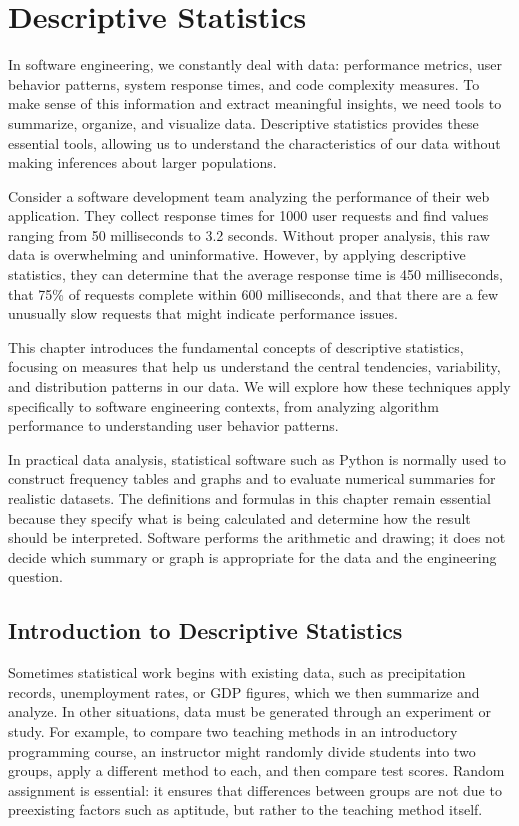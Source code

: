 \chapter{Descriptive Statistics}
\label{ch:data-descriptive-statistics}

In software engineering, we constantly deal with data: performance metrics, user behavior patterns, system response times, and code complexity measures. To make sense of this information and extract meaningful insights, we need tools to summarize, organize, and visualize data. Descriptive statistics provides these essential tools, allowing us to understand the characteristics of our data without making inferences about larger populations.

Consider a software development team analyzing the performance of their web application. They collect response times for 1000 user requests and find values ranging from 50 milliseconds to 3.2 seconds. Without proper analysis, this raw data is overwhelming and uninformative. However, by applying descriptive statistics, they can determine that the average response time is 450 milliseconds, that 75\% of requests complete within 600 milliseconds, and that there are a few unusually slow requests that might indicate performance issues.

This chapter introduces the fundamental concepts of descriptive statistics, focusing on measures that help us understand the central tendencies, variability, and distribution patterns in our data. We will explore how these techniques apply specifically to software engineering contexts, from analyzing algorithm performance to understanding user behavior patterns.

In practical data analysis, statistical software such as Python is normally used to construct frequency tables and graphs and to evaluate numerical summaries for realistic datasets. The definitions and formulas in this chapter remain essential because they specify what is being calculated and determine how the result should be interpreted. Software performs the arithmetic and drawing; it does not decide which summary or graph is appropriate for the data and the engineering question.

\section{Introduction to Descriptive Statistics} \label{sec:ch1-introduction}

Sometimes statistical work begins with existing data, such as precipitation records, unemployment rates, or GDP figures, which we then summarize and analyze. In other situations, data must be generated through an experiment or study. For example, to compare two teaching methods in an introductory programming course, an instructor might randomly divide students into two groups, apply a different method to each, and then compare test scores. Random assignment is essential: it ensures that differences between groups are not due to preexisting factors such as aptitude, but rather to the teaching method itself.

